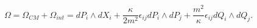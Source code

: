 \begin{equation}
     \Omega=\Omega_{CM}+\Omega_{int}=
     dP_{i}\wedge dX_{i}
     +\frac{\kappa}{2m^2}\epsilon_{ij}dP_{i}\wedge dP_{j}
     +\frac{m^2}{\kappa}\epsilon_{ij}
     dQ_{i}\wedge dQ_{j}.
     \label{sympstr}
\end{equation}

